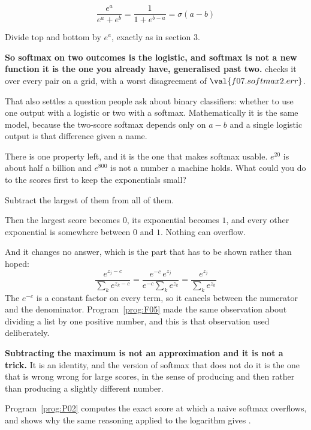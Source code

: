\begin{fr}
\begin{ansblock}
\[ \frac{e^{a}}{e^{a} + e^{b}}
   = \frac{1}{1 + e^{b-a}} = \sigma(a - b) \]
\end{ansblock}

Divide top and bottom by $e^{a}$, exactly as in section 3.

\textbf{So softmax on two outcomes is the logistic, and softmax is not a new
function \dash{} it is the one you already have, generalised past two.}
 checks it over every pair on a grid, with a
worst disagreement of $\val{f07.softmax2.err}$.

That also settles a question people ask about binary classifiers: whether to
use one output with a logistic or two with a softmax. Mathematically it is the
same model, because the two-score softmax depends only on $a - b$ and a single
logistic output is that difference given a name.

There is one property left, and it is the one that makes softmax usable.
$e^{20}$ is about half a billion and $e^{800}$ is not a number a machine
holds. What could you do to the scores first to keep the exponentials small?
\nextframe
\end{fr}

\begin{fr}
\begin{ansblock}
Subtract the largest of them from all of them.
\end{ansblock}

Then the largest score becomes $0$, its exponential becomes $1$, and every
other exponential is somewhere between $0$ and $1$. Nothing can overflow.

And it changes no answer, which is the part that has to be shown rather than
hoped:
\[ \frac{e^{z_j - c}}{\sum_k e^{z_k - c}}
   = \frac{e^{-c}\,e^{z_j}}{e^{-c}\sum_k e^{z_k}}
   = \frac{e^{z_j}}{\sum_k e^{z_k}} \]
The $e^{-c}$ is a constant factor on every term, so it cancels between the
numerator and the denominator. Program~\ref{prog:F05} made the same
observation about dividing a list by one positive number, and this is that
observation used deliberately.

\begin{warning}
\textbf{Subtracting the maximum is not an approximation and it is not a
trick.} It is an identity, and the version of softmax that does not do it is
the one that is wrong \dash{} wrong for large scores, in the sense of
producing  and then  rather than producing a slightly
different number.

Program~\ref{prog:P02} computes the exact score at which a naive softmax
overflows, and shows why the same reasoning applied to the logarithm gives
.
\end{warning}
\end{fr}

